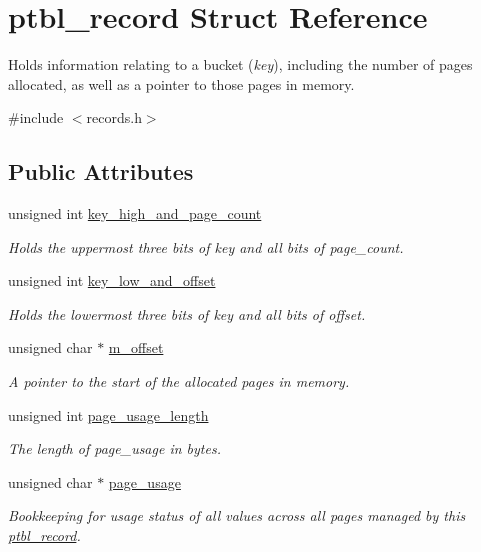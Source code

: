 \hypertarget{structptbl__record}{}\section{ptbl\+\_\+record Struct Reference}
\label{structptbl__record}


Holds information relating to a bucket ({\itshape key}), including the number of pages allocated, as well as a pointer to those pages in memory.  




{\ttfamily \#include $<$records.\+h$>$}

\subsection*{Public Attributes}
\begin{DoxyCompactItemize}
\item 
unsigned int \mbox{\hyperlink{structptbl__record_a34c3fcdd6600f21e6708955bc93195d6}{key\+\_\+high\+\_\+and\+\_\+page\+\_\+count}}
\begin{DoxyCompactList}\small\item\em Holds the uppermost three bits of {\itshape key} and all bits of {\itshape page\+\_\+count}. \end{DoxyCompactList}\item 
unsigned int \mbox{\hyperlink{structptbl__record_a50bac56284cd6f4e527a322e07d28772}{key\+\_\+low\+\_\+and\+\_\+offset}}
\begin{DoxyCompactList}\small\item\em Holds the lowermost three bits of {\itshape key} and all bits of {\itshape offset}. \end{DoxyCompactList}\item 
unsigned char $\ast$ \mbox{\hyperlink{structptbl__record_acec45fcdf4427d3a1b62c84973d5f484}{m\+\_\+offset}}
\begin{DoxyCompactList}\small\item\em A pointer to the start of the allocated pages in memory. \end{DoxyCompactList}\item 
\mbox{\label{structptbl__record_ab5a995939843a27fce29eaf0d153e8a6}} 
unsigned int \mbox{\hyperlink{structptbl__record_ab5a995939843a27fce29eaf0d153e8a6}{page\+\_\+usage\+\_\+length}}
\begin{DoxyCompactList}\small\item\em The length of {\itshape page\+\_\+usage} in bytes. \end{DoxyCompactList}\item 
unsigned char $\ast$ \mbox{\hyperlink{structptbl__record_aa2164881b8f812e973541c819152a8fe}{page\+\_\+usage}}
\begin{DoxyCompactList}\small\item\em Bookkeeping for usage status of all values across all pages managed by this {\itshape \mbox{\hyperlink{structptbl__record}{ptbl\+\_\+record}}}. \end{DoxyCompactList}\end{DoxyCompactItemize}


